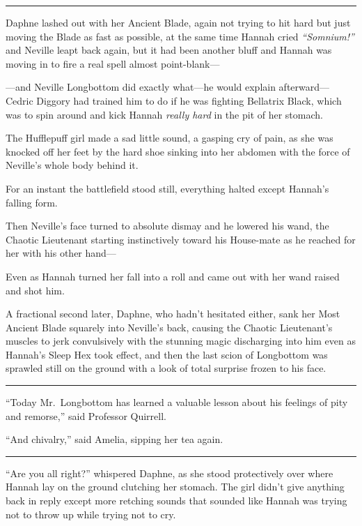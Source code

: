 \begin{center}\rule{3in}{0.4pt}\end{center}

Daphne lashed out with her Ancient Blade, again not trying to hit hard
but just moving the Blade as fast as possible, at the same time Hannah
cried \emph{``Somnium!''} and Neville leapt back again, but it had been
another bluff and Hannah was moving in to fire a real spell almost
point-blank---

---and Neville Longbottom did exactly what---he would explain
afterward---Cedric Diggory had trained him to do if he was fighting
Bellatrix Black, which was to spin around and kick Hannah \emph{really
hard} in the pit of her stomach.

The Hufflepuff girl made a sad little sound, a gasping cry of pain, as
she was knocked off her feet by the hard shoe sinking into her abdomen
with the force of Neville's whole body behind it.

For an instant the battlefield stood still, everything halted except
Hannah's falling form.

Then Neville's face turned to absolute dismay and he lowered his wand,
the Chaotic Lieutenant starting instinctively toward his House-mate as
he reached for her with his other hand---

Even as Hannah turned her fall into a roll and came out with her wand
raised and shot him.

A fractional second later, Daphne, who hadn't hesitated either, sank her
Most Ancient Blade squarely into Neville's back, causing the Chaotic
Lieutenant's muscles to jerk convulsively with the stunning magic
discharging into him even as Hannah's Sleep Hex took effect, and then
the last scion of Longbottom was sprawled still on the ground with a
look of total surprise frozen to his face.

\begin{center}\rule{3in}{0.4pt}\end{center}

``Today Mr.~Longbottom has learned a valuable lesson about his feelings
of pity and remorse,'' said Professor Quirrell.

``And chivalry,'' said Amelia, sipping her tea again.

\begin{center}\rule{3in}{0.4pt}\end{center}

``Are you all right?'' whispered Daphne, as she stood protectively over
where Hannah lay on the ground clutching her stomach. The girl didn't
give anything back in reply except more retching sounds that sounded
like Hannah was trying not to throw up while trying not to cry.

